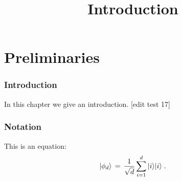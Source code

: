 

%



\part{Preliminaries}
\label{book-part-preliminaries}

\title{Introduction}
\label{introduction}


\maketitle


\tableofcontents

\section{Introduction}
\label{section:introduction}

In this chapter we give an introduction. [edit test 17]

\section{Notation}
\label{section-notation}

This is an equation:
\begin{equation}
\label{eq:me-state}
 |\phi_d\rangle \,=\,\frac{1}{\sqrt{d}} \sum_{i=1}^d |i\rangle|i\rangle\;.
\end{equation}








